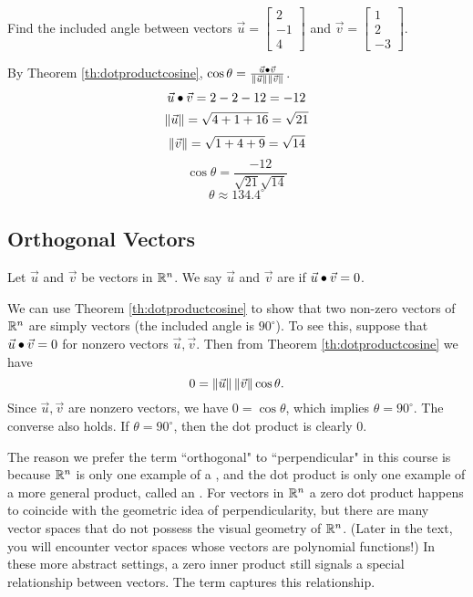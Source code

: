 \documentclass{ximera}
\begin{document}
\begin{example}\label{ex:anglebetweenvectors}
Find the included angle between vectors $\vec{u}=\begin{bmatrix}2\\-1\\4\end{bmatrix}$ and $\vec{v}=\begin{bmatrix}1\\2\\-3\end{bmatrix}$.
 
\begin{explanation}
By Theorem \ref{th:dotproductcosine}, $\cos \theta=\frac{\vec{u}\bullet \vec{v}}{\left\|\vec{u}\right\|\left\|\vec{v}\right\|}$. 
$$\vec{u}\bullet\vec{v}=2-2-12=-12$$
$$\left\|\vec{u}\right\|=\sqrt{4+1+16}=\sqrt{21}$$
$$\left\|\vec{v}\right\|=\sqrt{1+4+9}=\sqrt{14}$$
$$\cos\theta =\frac{-12}{\sqrt{21}\sqrt{14}}$$
$$\theta \approx 134.4^{\circ}  $$
\end{explanation}
\end{example}
 
\subsection*{Orthogonal Vectors}
 
\begin{definition}\label{def:orthovectors}
Let $\vec{u}$ and $\vec{v}$ be vectors in $\mathbb{R}^n$. We say $\vec{u}$ and $\vec{v}$ are  if $\vec{u}\bullet \vec{v}=0$.
\end{definition}
 
We can use Theorem \ref{th:dotproductcosine} to show that two non-zero  vectors of $\mathbb{R}^n$ are simply  vectors (the included angle is $90^{\circ}$).  To see this, suppose that $\vec{u}\bullet\vec{v}=0$ for nonzero vectors $\vec{u},\vec{v}$.  Then from Theorem \ref{th:dotproductcosine} we have
$$0=\left\|\vec{u}\right\|\left\|\vec{v}\right\|\cos\theta.$$
Since $\vec{u},\vec{v}$ are nonzero vectors, we have $0=\cos\theta$, which implies $\theta=90^{\circ}$.  The converse also holds.  If $\theta=90^{\circ}$, then the dot product is clearly 0.
 
The reason we prefer the term ``orthogonal" to ``perpendicular" in this course is because $\mathbb{R}^n$ is only one example of a , and the dot product is only one example of a more general product, called an .  For vectors in $\mathbb{R}^n$ a zero dot product happens to coincide with the geometric idea of perpendicularity, but there are many vector spaces that do not possess the visual geometry of $\mathbb{R}^n$.  (Later in the text, you will encounter vector spaces whose vectors are polynomial functions!)  In these more abstract settings, a zero inner product still signals a special relationship between vectors.  The term  captures this relationship.
 
\end{document}
